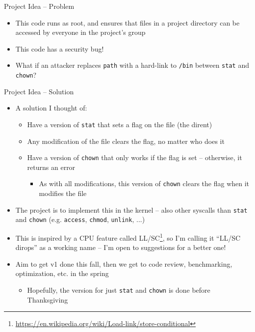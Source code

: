 \documentclass[aspectratio=169]{beamer}
\begin{document}
\begin{frame}[fragile]{Project Idea -- Problem}
	\begin{itemize}
		\item This code runs as root, and ensures that files in a project directory can be accessed by everyone in the project's group
	\end{itemize}

	\begin{example}
		\begin{semiverbatim}\end{semiverbatim}
	\end{example}

	\begin{itemize}
		\pause
		\item This code has a security bug!
		      \pause
		\item What if an attacker replaces \texttt{path} with a hard-link to \texttt{/bin} between \texttt{stat} and \texttt{chown}?
	\end{itemize}
\end{frame}

\begin{frame}{Project Idea -- Solution}
	\begin{itemize}
		\item A solution I thought of:
		      \begin{itemize}
			      \item Have a version of \texttt{stat} that sets a flag on the file (the dirent)
			      \item Any modification of the file clears the flag, no matter who does it
			      \item Have a version of \texttt{chown} that only works if the flag is set -- otherwise, it returns an error
			            \begin{itemize}
				            \item As with all modifications, this version of \texttt{chown} clears the flag when it modifies the file
			            \end{itemize}
		      \end{itemize}
		\item The project is to implement this in the kernel -- also other syscalls than \texttt{stat} and \texttt{chown} (e.g. \texttt{access}, \texttt{chmod}, \texttt{unlink}, ...)
		\item This is inspired by a CPU feature called LL/SC\footnote{\url{https://en.wikipedia.org/wiki/Load-link/store-conditional}}, so I'm calling it ``LL/SC dirops'' as a working name -- I'm open to suggestions for a better one!
		\item Aim to get v1 done this fall, then we get to code review, benchmarking, optimization, etc. in the spring
		      \begin{itemize}
			      \item Hopefully, the version for just \texttt{stat} and \texttt{chown} is done before Thanksgiving
		      \end{itemize}
	\end{itemize}
\end{frame}
\end{document}
